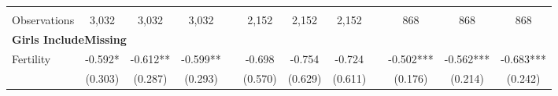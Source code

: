 \begin{landscape}
\begin{table}[htpb!]
\begin{center}
\begin{tabular}{lcccp{2mm}cccp{2mm}ccc}
\begin{footnotesize}\end{footnotesize}&\begin{footnotesize}\end{footnotesize}&\begin{footnotesize}\end{footnotesize}&\begin{footnotesize}\end{footnotesize}&\begin{footnotesize}\end{footnotesize}&\begin{footnotesize}\end{footnotesize}&\begin{footnotesize}\end{footnotesize}&\begin{footnotesize}\end{footnotesize}&\begin{footnotesize}\end{footnotesize}&\begin{footnotesize}\end{footnotesize}&\begin{footnotesize}\end{footnotesize}&\begin{footnotesize}\end{footnotesize}\\Observations&3,032&3,032&3,032&&2,152&2,152&2,152&&868&868&868\\
\multicolumn{12}{l}{\textbf{Girls IncludeMissing}}\\ 
Fertility&-0.592*&-0.612**&-0.599**&&-0.698&-0.754&-0.724&&-0.502***&-0.562***&-0.683***\\
&(0.303)&(0.287)&(0.293)&&(0.570)&(0.629)&(0.611)&&(0.176)&(0.214)&(0.242)\\

\end{tabular}
\end{center}
\end{table}
\end{landscape}

